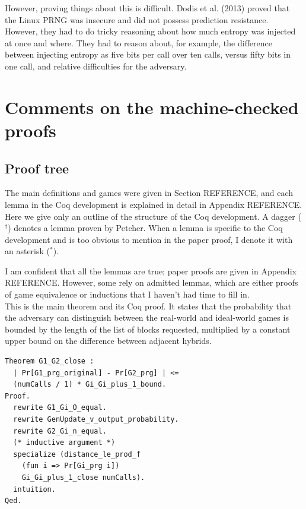 \documentclass[12pt,lot, lof]{puthesis}
\begin{document}
{However, proving things about this is difficult. Dodis et al. (2013) proved that the Linux PRNG was insecure and did not possess prediction resistance. However, they had to do tricky reasoning about how much entropy was injected at once and where. They had to reason about, for example, the difference between injecting entropy as five bits per call over ten calls, versus fifty bits in one call, and relative difficulties for the adversary. 



\chapter{Comments on the machine-checked proofs}

\section{Proof tree}

The main definitions and games were given in Section REFERENCE, and each lemma in the Coq development is explained in detail in Appendix REFERENCE. Here we give only an outline of the structure of the Coq development. A dagger ($^\dag$) denotes a lemma proven by Petcher. When a lemma is specific to the Coq development and is too obvious to mention in the paper proof, I denote it with an asterisk ($^*$).

I am confident that all the lemmas are true; paper proofs are given in Appendix REFERENCE. However, some rely on admitted lemmas, which are either proofs of game equivalence or inductions that I haven't had time to fill in. \\

This is the main theorem and its Coq proof. It states that the probability that the adversary can distinguish between the real-world and ideal-world games is bounded by the length of the list of blocks requested, multiplied by a constant upper bound on the difference between adjacent hybrids.

\begin{lstlisting}
Theorem G1_G2_close :
  | Pr[G1_prg_original] - Pr[G2_prg] | <= 
  (numCalls / 1) * Gi_Gi_plus_1_bound.
Proof.
  rewrite G1_Gi_O_equal.
  rewrite GenUpdate_v_output_probability.
  rewrite G2_Gi_n_equal.
  (* inductive argument *)
  specialize (distance_le_prod_f 
  	(fun i => Pr[Gi_prg i]) 
	Gi_Gi_plus_1_close numCalls).
  intuition.
Qed.
\end{lstlisting}

}
\end{document}
